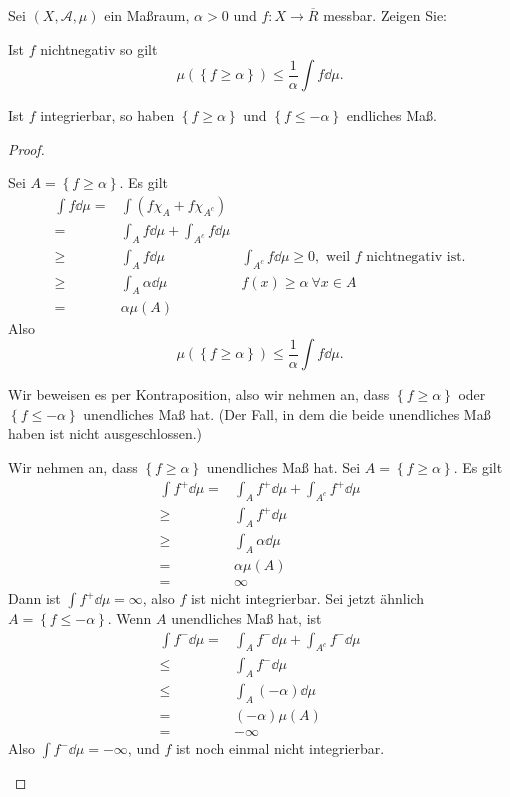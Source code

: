 \begin{Problem}
	Sei $(X,\mathcal{A},\mu)$ ein Maßraum, $\alpha>0$ und $f:X\to \overline{R}$ messbar. Zeigen Sie:
	\begin{parts}
		\item Ist $f$ nichtnegativ so gilt
			\[
				\mu\left( \left\{ f\ge \alpha \right\}  \right) \le \frac{1}{\alpha}\int f\dd{\mu}
			.\] 
		\item Ist $f$ integrierbar, so haben $\left\{ f\ge\alpha \right\} $ und $\left\{ f\le -\alpha \right\} $ endliches Maß.
	\end{parts}
\end{Problem}
\begin{proof}
	\begin{parts}
	\item Sei $A=\left\{ f\ge \alpha \right\} $. Es gilt
		\begin{align*}
			\int f\dd{\mu}=& \int \left( f\chi_A+f\chi_{A^c} \right) \\
			=& \int_A f\dd{\mu}+\int_{A^c} f\dd{\mu}\\
			\ge&\int_A f\dd{\mu} & \int_{A^c}f\dd{\mu}\ge 0,\text{ weil }f\text{ nichtnegativ ist.}\\
		\ge&\int_A \alpha \dd{\mu} & f(x)\ge \alpha~\forall x\in A\\
		=&\alpha\mu(A)
		\end{align*}
		Also
		\[
			\mu\left( \left\{ f\ge \alpha \right\}  \right) \le \frac{1}{\alpha}\int f\dd{\mu}
		.\] 
	\item Wir beweisen es per Kontraposition, also wir nehmen an, dass $\left\{ f\ge \alpha \right\} $ oder $\left\{ f\le -\alpha \right\} $ unendliches Maß hat. (Der Fall, in dem die beide unendliches Maß haben ist nicht ausgeschlossen.)

		Wir nehmen an, dass $\left\{ f\ge\alpha \right\} $ unendliches Maß hat. Sei $A=\left\{ f\ge \alpha \right\} $. Es gilt
		\begin{align*}
			\int f^+\dd{\mu}=&\int_A f^+\dd{\mu}+\int_{A^c}f^+\dd{\mu}\\
			\ge& \int_A f^+\dd{\mu}\\
			\ge& \int_A \alpha\dd{\mu}\\
			=& \alpha\mu(A)\\
			=&\infty
		\end{align*}
		Dann ist $\int f^+\dd{\mu}=\infty$, also $f$ ist nicht integrierbar.  Sei jetzt ähnlich $A=\left\{ f\le -\alpha \right\} $. Wenn $A$ unendliches Maß hat, ist
		\begin{align*}
			\int f^-\dd{\mu}=&\int_A f^-\dd{\mu}+\int_{A^c}f^-\dd{\mu}\\
			\le& \int_A f^-\dd{\mu}\\
			\le&\int_A(-\alpha)\dd{\mu}\\
			=&(-\alpha)\mu(A)\\
			=&-\infty
		\end{align*}
		Also $\int f^-\dd{\mu}=-\infty$, und $f$ ist noch einmal nicht integrierbar.
	\end{parts}
\end{proof}
